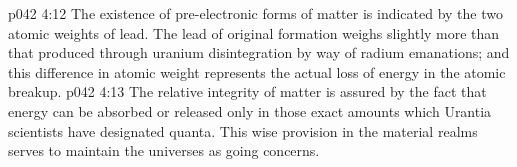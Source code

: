 \vs p042 4:12 \pc The existence of pre\hyp{}electronic forms of matter is indicated by the two atomic weights of lead. The lead of original formation weighs slightly more than that produced through uranium disintegration by way of radium emanations; and this difference in atomic weight represents the actual loss of energy in the atomic breakup.
\vs p042 4:13 \pc The relative integrity of matter is assured by the fact that energy can be absorbed or released only in those exact amounts which Urantia scientists have designated quanta. This wise provision in the material realms serves to maintain the universes as going concerns.
